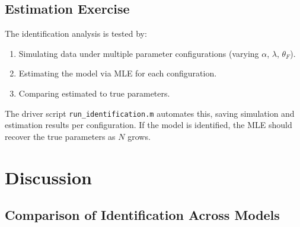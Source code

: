 \documentclass[12pt]{article}
\theoremstyle{plain}
\theoremstyle{plain}
\theoremstyle{definition}  %
\theoremstyle{remark}  %
\begin{document}
\subsection{Estimation Exercise}\label{sec:estimation_exercise}

The identification analysis is tested by:
\begin{enumerate}
    \item Simulating data under multiple parameter configurations (varying $\alpha$, $\lambda$, $\theta_F$).
    \item Estimating the model via MLE for each configuration.
    \item Comparing estimated to true parameters.
\end{enumerate}
The driver script \texttt{run\_identification.m} automates this, saving simulation and estimation results per configuration.  If the model is identified, the MLE should recover the true parameters as $N$ grows.



\newpage
\section{Discussion}\label{sec:discussion}

\subsection{Comparison of Identification Across Models}
\end{document}

